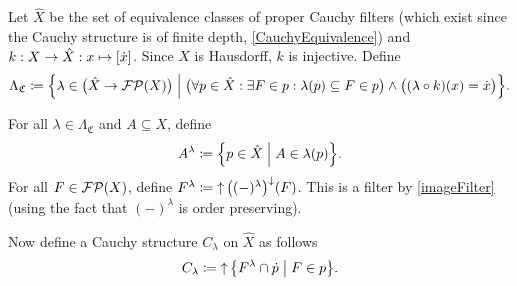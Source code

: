 Let $\hat{X}$ be the set of equivalence classes of proper Cauchy filters (which exist since the Cauchy structure is of finite depth, \ref{CauchyEquivalence}) and $k: X\to \hat{X}: x\mapsto [\dot{x}]$. Since $X$ is Hausdorff, $k$ is injective.
Define
\[ \Lambda_\mathfrak{C} \defeq \setbuilder{\lambda\in \big(\hat{X} \to \powerfilters(X)\big)}{\big(\forall p\in \hat{X}: \exists F\in p: \lambda(p) \subseteq F \in p\big) \land \big((\lambda\circ k)(x) = \pfilter{x}\big)}. \]

For all $\lambda \in \Lambda_\mathfrak{C}$ and $A\subseteq X$, define
\[ A^\lambda \defeq \setbuilder{p\in \hat{X}}{A\in \lambda(p)}. \]
For all $F\in \operatorname{\mathcal{FP}}(X)$, define $F^\lambda \coloneqq \operatorname{\uparrow} \big((-)^\lambda\big)^\downarrow(F)$. This is a filter by \ref{imageFilter} (using the fact that $(-)^\lambda$ is order preserving).

Now define a Cauchy structure $C_\lambda$ on $\hat{X}$ as follows
\[ C_\lambda \defeq \upset\setbuilder{F^\lambda \cap \pfilter{p}}{F\in p}. \]

